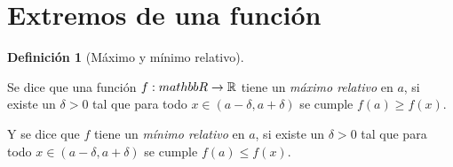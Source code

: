 \documentclass[
  a4paper,
]{scrreport}
\theoremstyle{definition}
\theoremstyle{plain}
\theoremstyle{definition}
\newtheorem{definition}{Definición}[chapter]
\theoremstyle{definition}
\theoremstyle{plain}
\theoremstyle{plain}
\theoremstyle{remark}
\begin{document}
\section{Extremos de una función}\label{extremos-de-una-funciuxf3n}

\begin{definition}[Máximo y mínimo
relativo]\protect\hypertarget{def-extremos-funcion}{}\label{def-extremos-funcion}

Se dice que una función \(f:\\mathbb{R}\rightarrow\mathbb{R}\) tiene un
\emph{máximo relativo} en \(a\), si existe un \(\delta>0\) tal que para
todo \(x\in (a-\delta,a+\delta)\) se cumple \(f(a)\geq f(x)\).

Y se dice que \(f\) tiene un \emph{mínimo relativo} en \(a\), si existe
un \(\delta>0\) tal que para todo \(x\in (a-\delta,a+\delta)\) se cumple
\(f(a)\leq f(x)\).

\end{definition}
\end{document}
